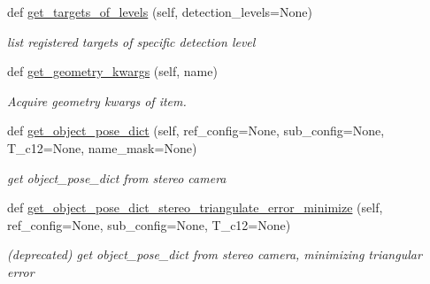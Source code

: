 \begin{DoxyCompactItemize}
def \hyperlink{classrnb-planning_1_1src_1_1pkg_1_1detector_1_1aruco_1_1stereo_1_1_aruco_stereo_a88d4104cd83e3d1fd82168a9bc449237}{get\+\_\+targets\+\_\+of\+\_\+levels} (self, detection\+\_\+levels=None)
\begin{DoxyCompactList}\small\item\em list registered targets of specific detection level \end{DoxyCompactList}\item 
def \hyperlink{classrnb-planning_1_1src_1_1pkg_1_1detector_1_1aruco_1_1stereo_1_1_aruco_stereo_aa2f75d539c4b767ef3c289156ff15ff8}{get\+\_\+geometry\+\_\+kwargs} (self, name)
\begin{DoxyCompactList}\small\item\em Acquire geometry kwargs of item. \end{DoxyCompactList}\item 
def \hyperlink{classrnb-planning_1_1src_1_1pkg_1_1detector_1_1aruco_1_1stereo_1_1_aruco_stereo_a6ca0715958847631f53e254622919ebb}{get\+\_\+object\+\_\+pose\+\_\+dict} (self, ref\+\_\+config=None, sub\+\_\+config=None, T\+\_\+c12=None, name\+\_\+mask=None)
\begin{DoxyCompactList}\small\item\em get object\+\_\+pose\+\_\+dict from stereo camera \end{DoxyCompactList}\item 
\mbox{\label{classrnb-planning_1_1src_1_1pkg_1_1detector_1_1aruco_1_1stereo_1_1_aruco_stereo_a4de85b5298543fca387abc5915ee4a5f}} 
def \hyperlink{classrnb-planning_1_1src_1_1pkg_1_1detector_1_1aruco_1_1stereo_1_1_aruco_stereo_a4de85b5298543fca387abc5915ee4a5f}{get\+\_\+object\+\_\+pose\+\_\+dict\+\_\+stereo\+\_\+triangulate\+\_\+error\+\_\+minimize} (self, ref\+\_\+config=None, sub\+\_\+config=None, T\+\_\+c12=None)
\begin{DoxyCompactList}\small\item\em (deprecated) get object\+\_\+pose\+\_\+dict from stereo camera, minimizing triangular error \end{DoxyCompactList}\end{DoxyCompactItemize}
